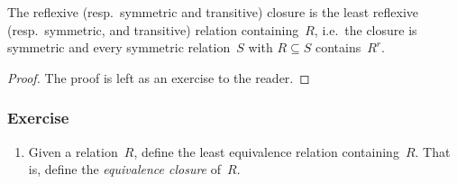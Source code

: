 \begin{proposition}
  The reflexive (resp.\ symmetric and transitive) closure is the least reflexive
  (resp.\ symmetric, and transitive) relation containing~$R$, i.e.\ the closure
  is symmetric and every symmetric relation~$S$ with $R \subseteq S$
  contains~$R^r$.
\end{proposition}
\begin{proof}
  The proof is left as an exercise to the reader.
\end{proof}
\subsubsection*{Exercise}
\begin{enumerate}
  \item Given a relation~$R$, define the least equivalence relation 
    containing~$R$. That is, define the \emph{equivalence closure} of~$R$.
\end{enumerate}

